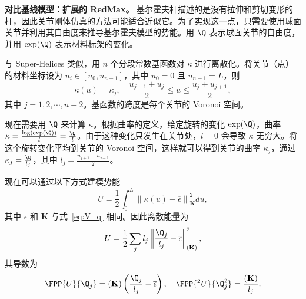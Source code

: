  \noindent\textbf{对比基线模型：扩展的 RedMax。}\label{model_redMax}
基尔霍夫杆描述的是没有拉伸和剪切变形的杆，因此关节刚体仿真的方法可能适合近似它。为了实现这一点，只需要使用球面关节并利用其自由度来推导基尔霍夫模型的势能。用 $\Q$ 表示球面关节的自由度，并用 $\exp(\Q)$ 表示材料标架的变化。



与 Super-Helices 类似，用 $n$ 个分段常数基函数对 $\kappa$ 进行离散化。将关节（点）的材料坐标设为 $u_i \in [u_0, u_{n-1}]$，其中 $u_0 = 0$ 且 $u_{n-1} = L$，则
\begin{equation}
  \kappa(u) = \kappa_j,  \quad   \frac{u_{j-1} + u_j}{2} \leq u \leq \frac{u_j + u_{j+1}}{2},
\end{equation}
其中 $j=1,2,\cdots,n-2$。基函数的跨度是每个关节的 Voronoi 空间。

现在需要用 $\Q$ 来计算 $\kappa$。根据曲率的定义，给定旋转的变化 $\exp(\Q)$，曲率 $\kappa = \frac{\log(\exp(\Q))}{l} = \frac{\Q}{l}$。由于这种变化只发生在关节处，$l=0$ 会导致 $\kappa$ 无穷大。将这个旋转变化平均到关节的 Voronoi 空间，这样就可以得到关节的曲率 $\kappa_j$，通过 $\kappa_j = \frac{\Q}{l_j}$，其中 $l_j = \frac{u_{j+1} - u_{j-1}}{2}$。


现在可以通过以下方式建模势能
\begin{equation}
  U=\frac{1}{2}\int_0^L \left\| \kappa(u) - \overline{\epsilon}\right\|_{\mathbf{K}}^2 du,
\end{equation}
其中 $\overline{\epsilon}$ 和 $\mathbf{K}$ 与式~\ref{eq:V_q} 相同。因此离散能量为
\begin{equation}
  U= \frac{1}{2}\sum_j l_j \left\| \frac{\Q_j}{l_j} - \overline{\epsilon}\right\|_{\left(\mathbf{K}\right)}^2,
\end{equation}
其导数为
\begin{equation}
    \FPP{U}{\Q_j} = \left(\mathbf{K}\right) \left( \frac{\Q_j}{l_j} - \overline{\epsilon}\right),\quad
    \FPP{^2U}{\Q_j^2} = \frac{\left(\mathbf{K}\right)}{l_j} .
\end{equation}


